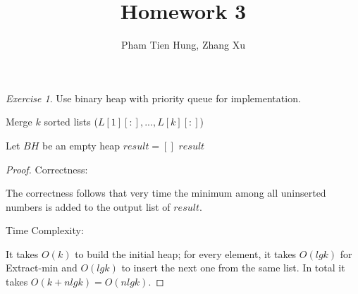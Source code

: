 \documentclass[a4paper,10pt,twoside]{article}
\title{Homework 3}
\author{Pham Tien Hung, Zhang Xu}
\date{}
\theoremstyle{plain}
\theoremstyle{definition}
\theoremstyle{remark}
\newtheorem{exercise}{Exercise}
\begin{document}
\maketitle
\begin{exercise}

Use binary heap with priority queue for implementation.

\begin{algorithm}[h]
	\caption{Merge $k$ sorted lists ($L[1][:], ..., L[k][:]$)}
	Let $BH$ be an empty heap\;
	$result = [  ]$
	\Return $result$\;
\end{algorithm}

\begin{proof}
Correctness: 

The correctness follows that very time the minimum among all uninserted numbers is added to the output list of $result$.

Time Complexity:

It takes $O(k)$ to build the initial heap; for every element, it takes $O(lg k)$ for Extract-min and $O(lg k)$ to insert the next one from the same list. In total it takes $O(k + n lg k) = O(n lg k)$.

\end{proof}
\end{exercise}
\end{document}
